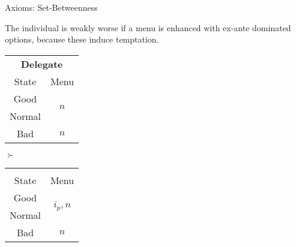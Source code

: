 \documentclass[usenames,dvipsnames,aspectratio=169,11pt, envcountsect, handout]{beamer}
\begin{document}
\begin{frame}{Axioms: Set-Betweenness}\label{betweenness}

	\begin{axiom}\label{ax:sbetweenness}
		The individual is weakly worse if a menu is enhanced with ex-ante dominated options, because these induce temptation.
	\end{axiom}

	\vfill

	\begin{table}[H]
		\centering
		\begin{minipage}{0.4\textwidth}
			\centering
			\begin{tabular}{c | c}
				\multicolumn{2}{c}{\textbf{Delegate}}                         \\
				State                & Menu                                   \\
				\hline
				{\color{blue}Good}   & \multirow{2}{*}{{\color{blue}\( n \)}} \\
				{\color{blue}Normal} &                                        \\
				Bad                  & \( n \)                                \\
			\end{tabular}
			\vspace{0.5cm} %
		\end{minipage}%
		\( \succ \)
		\begin{minipage}{0.4\textwidth}
			\centering
			\begin{tabular}{c | c}
				\multicolumn{2}{c}{}                                              \\
				State                & Menu                                       \\
				\hline
				{\color{blue}Good}   & \multirow{2}{*}{{\color{blue}\(i_p, n \)}} \\
				{\color{blue}Normal} &                                            \\
				Bad                  & \( n \)                                    \\
			\end{tabular}
			\vspace{0.5cm} %
		\end{minipage} %
	\end{table}

	\begin{flushright}
		\hyperlink{betweennessapp}{}
	\end{flushright}


\end{frame}
\end{document}

